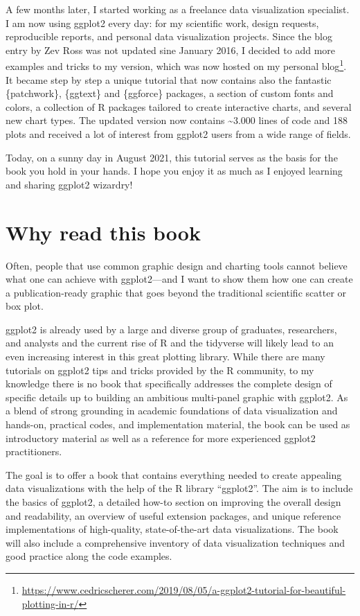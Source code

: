 \documentclass[
]{krantz}
\renewcommand{\href}[2]{#2\footnote{\url{#1}}}
\begin{document}
A few months later, I started working as a freelance data visualization specialist. I am now using ggplot2 every day: for my scientific work, design requests, reproducible reports, and personal data visualization projects. Since the blog entry by Zev Ross was not updated sine January 2016, I decided to add more examples and tricks to my version, which was now hosted on my \href{https://www.cedricscherer.com/2019/08/05/a-ggplot2-tutorial-for-beautiful-plotting-in-r/}{personal blog}. It became step by step a unique tutorial that now contains also the fantastic \{patchwork\}, \{ggtext\} and \{ggforce\} packages, a section of custom fonts and colors, a collection of R packages tailored to create interactive charts, and several new chart types. The updated version now contains \textasciitilde3.000 lines of code and 188 plots and received a lot of interest from ggplot2 users from a wide range of fields.

Today, on a sunny day in August 2021, this tutorial serves as the basis for the book you hold in your hands. I hope you enjoy it as much as I enjoyed learning and sharing ggplot2 wizardry!

\hypertarget{why-read-this-book}{%
\section*{Why read this book}\label{why-read-this-book}}


Often, people that use common graphic design and charting tools cannot believe what one can achieve with ggplot2---and I want to show them how one can create a publication-ready graphic that goes beyond the traditional scientific scatter or box plot.

ggplot2 is already used by a large and diverse group of graduates, researchers, and analysts and the current rise of R and the tidyverse will likely lead to an even increasing interest in this great plotting library. While there are many tutorials on ggplot2 tips and tricks provided by the R community, to my knowledge there is no book that specifically addresses the complete design of specific details up to building an ambitious multi-panel graphic with ggplot2. As a blend of strong grounding in academic foundations of data visualization and hands-on, practical codes, and implementation material, the book can be used as introductory material as well as a reference for more experienced ggplot2 practitioners.

The goal is to offer a book that contains everything needed to create appealing data visualizations with the help of the R library ``ggplot2''. The aim is to include the basics of ggplot2, a detailed how-to section on improving the overall design and readability, an overview of useful extension packages, and unique reference implementations of high-quality, state-of-the-art data visualizations. The book will also include a comprehensive inventory of data visualization techniques and good practice along the code examples.
\end{document}
